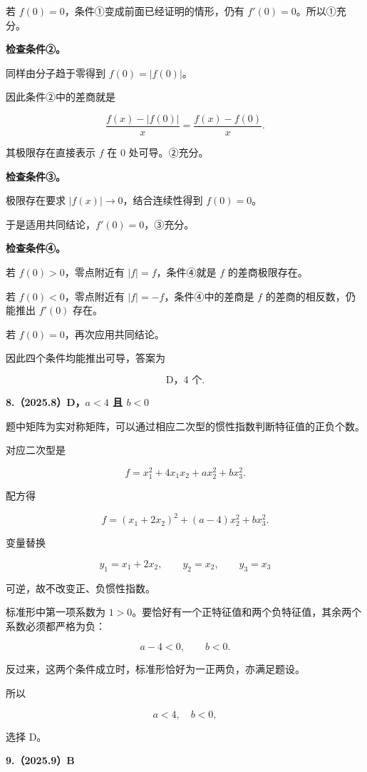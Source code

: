 \documentclass[UTF8,11pt,fontset=windows]{ctexart}
\begin{document}
若 $f(0)=0$，条件①变成前面已经证明的情形，仍有 $f'(0)=0$。所以①充分。

\textbf{检查条件②。}

同样由分子趋于零得到 $f(0)=|f(0)|$。

因此条件②中的差商就是

$$
\frac{f(x)-|f(0)|}{x}=\frac{f(x)-f(0)}x.
$$

其极限存在直接表示 $f$ 在 $0$ 处可导。②充分。

\textbf{检查条件③。}

极限存在要求 $|f(x)|\to0$，结合连续性得到 $f(0)=0$。

于是适用共同结论，$f'(0)=0$，③充分。

\textbf{检查条件④。}

若 $f(0)>0$，零点附近有 $|f|=f$，条件④就是 $f$ 的差商极限存在。

若 $f(0)<0$，零点附近有 $|f|=-f$，条件④中的差商是 $f$ 的差商的相反数，仍能推出 $f'(0)$ 存在。

若 $f(0)=0$，再次应用共同结论。

因此四个条件均能推出可导，答案为

$$
\boxed{\text{D，4 个}}.
$$

\clearpage

\textbf{8.（2025.8）D，$a<4$ 且 $b<0$}

题中矩阵为实对称矩阵，可以通过相应二次型的惯性指数判断特征值的正负个数。

对应二次型是

$$
f=x_1^2+4x_1x_2+ax_2^2+bx_3^2.
$$

配方得

$$
f=(x_1+2x_2)^2+(a-4)x_2^2+bx_3^2.
$$

变量替换

$$
y_1=x_1+2x_2,\qquad y_2=x_2,\qquad y_3=x_3
$$

可逆，故不改变正、负惯性指数。

标准形中第一项系数为 $1>0$。要恰好有一个正特征值和两个负特征值，其余两个系数必须都严格为负：

$$
a-4<0,\qquad b<0.
$$

反过来，这两个条件成立时，标准形恰好为一正两负，亦满足题设。

所以

$$
\boxed{a<4,\quad b<0},
$$

选择 D。

\clearpage

\textbf{9.（2025.9）B}
\end{document}
